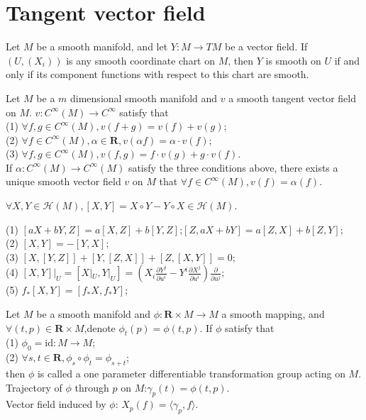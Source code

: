 \section{Tangent vector field}
\begin{newthem}
Let $M$ be a smooth manifold, and let $Y:M \to TM$ be a vector field. If $(U, (X_i))$ is any smooth coordinate chart on $M$, then $Y$ is smooth on $U$ if and only if its component functions with respect to this chart are smooth.
\end{newthem}

\begin{newthem}
Let $M$ be a $m$ dimensional smooth manifold and $v$ a smooth tangent vector field on $M$. $v:C^{\infty}(M) \to C^{\infty}$ satisfy that\\
(1) $\forall f,g \in C^{\infty}(M),v(f+g)=v(f)+v(g)$;\\
(2) $\forall f \in C^{\infty}(M),\alpha \in \bm{R},v(\alpha f)=\alpha \cdot v(f)$;\\
(3) $\forall f,g \in C^{\infty}(M),v(f,g) = f \cdot v(g) + g \cdot v(f)$.\\
If $\alpha:C^{\infty}(M) \to C^{\infty}(M)$ satisfy the three conditions above, there exists a unique smooth vector field $v$ on $M$ that $\forall f \in C^{\infty}(M),v(f)=\alpha(f)$.
\end{newthem}

\begin{newthem}
$\forall X,Y \in \mathcal{H}(M),[X,Y]=X \circ Y -Y \circ X \in \mathcal{H}(M)$.
\end{newthem}

\begin{newprop}
(1) $[aX+bY,Z]=a[X,Z]+b[Y,Z]$;$[Z,aX+bY]=a[Z,X]+b[Z,Y]$;\\
(2) $[X,Y]=-[Y,X]$;\\
(3) $[X,[Y,Z]] + [Y,[Z,X]] +[Z,[X,Y]]=0$;\\
(4) $[X,Y]|_{U} = [X|_{U},Y|_{U}] = (X_i \frac{\partial Y^j}{\partial u^i} - Y^i \frac{\partial X^j}{\partial u^i}) \frac{\partial}{\partial u^j}$;\\
(5) $f_{*}[X,Y] = [f_{*}X,f_{*}Y]$;
\end{newprop}

\begin{newdef}
Let $M$ be a smooth manifold and $\phi:\bm{R} \times M \to M$ a smooth mapping, and $\forall (t,p) \in \bm{R} \times M$,denote $\phi_{t}(p) = \phi(t,p)$. If $\phi$ satisfy that\\
(1) $\phi_0 = \mathrm{id}:M \to M$;\\
(2) $\forall s,t \in \bm{R}, \phi_s \circ \phi_t = \phi_{s+t}$;\\
then $\phi$ is called a one parameter differentiable transformation group acting on $M$.\\
Trajectory of $\phi$ through $p$ on $M$:$\gamma_p(t) = \phi(t,p)$.\\
Vector field induced by $\phi$: $X_p(f) = \langle \gamma_p , f \rangle$.
\end{newdef}

